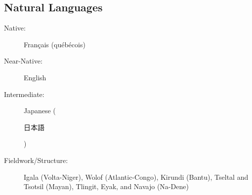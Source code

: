 \documentclass[margin,line]{resume}
\begin{document}
\begin{resume}
	\section{\mysidestyle Natural Languages}\vspace{2mm}
	\begin{description}
		\item[Native:] Français (québécois)
		\item[Near-Native:] English
		\item[Intermediate:] Japanese (\begin{CJK}{UTF8}{min}日本語\end{CJK})
		\item[Fieldwork/Structure:] Igala (Volta-Niger), Wolof (Atlantic-Congo), Kirundi (Bantu),
		      Tseltal and Tsotsil (Mayan), Tlingit, Eyak, and Navajo (Na-Dene)%
	\end{description}

	\BgThispage

\end{resume}
\end{document}
